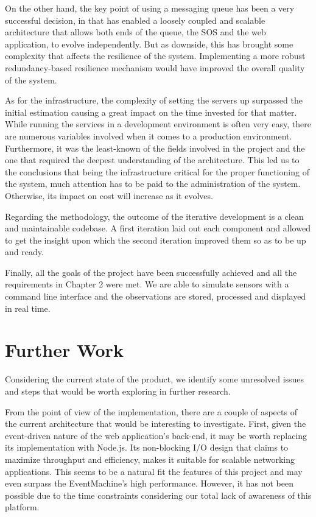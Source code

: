 On the other hand, the key point of using a messaging queue has been a very successful decision, in that has enabled a loosely coupled and scalable architecture that allows both ends of the queue, the SOS and the web application, to evolve independently. But as downside, this has brought some complexity that affects the resilience of the system. Implementing a more robust redundancy-based resilience mechanism would have improved the overall quality of the system.

As for the infrastructure, the complexity of setting the servers up surpassed the initial estimation causing a great impact on the time invested for that matter. While running the services in a development environment is often very easy, there are numerous variables involved when it comes to a production environment. Furthermore, it was the least-known of the fields involved in the project and the one that required the deepest understanding of the architecture. This led us to the conclusions that being the infrastructure critical for the proper functioning of the system, much attention has to be paid to the administration of the system. Otherwise, its impact on cost will increase as it evolves.

Regarding the methodology, the outcome of the iterative development is a clean and maintainable codebase. A first iteration laid out each component and allowed to get the insight upon which the second iteration improved them so as to be up and ready.

Finally, all the goals of the project have been successfully achieved and all the requirements in Chapter 2 were met. We are able to simulate sensors with a command line interface and the observations are stored, processed and displayed in real time.

\section{Further Work}

Considering the current state of the product, we identify some unresolved issues and steps that would be worth exploring in further research.

From the point of view of the implementation, there are a couple of aspects of the current architecture that would be interesting to investigate. First, given the event-driven nature of the web application's  back-end, it may be worth replacing its implementation with Node.js. Its non-blocking I/O design that claims to maximize throughput and efficiency, makes it suitable for scalable networking applications. This seems to be a natural fit the features of this project and may even surpass the EventMachine's high performance. However, it has not been possible due to the time constraints considering our total lack of awareness of this platform.

